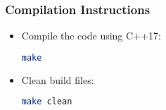 \documentclass{beamer}
\begin{document}
\begin{frame}[fragile]
  \frametitle{Compilation Instructions}
  \begin{itemize}
    \item Compile the code using C++17:
    \begin{lstlisting}[language=bash]
make
    \end{lstlisting}
    \item Clean build files:
    \begin{lstlisting}[language=bash]
make clean
    \end{lstlisting}
  \end{itemize}
\end{frame}
\end{document}
